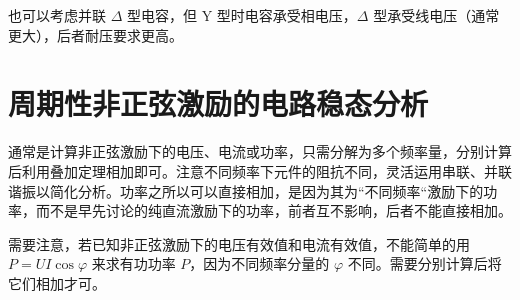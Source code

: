 \documentclass[UTF8]{report}
\theoremstyle{MyLineTheoremStyle} %
\theoremstyle{MyBlockTheoremStyle} %
\theoremstyle{MySubsubsectionStyle} %
\begin{document}
也可以考虑并联 $\Delta$ 型电容，但 Y 型时电容承受相电压，$\Delta$ 型承受线电压（通常更大），后者耐压要求更高。


\section{周期性非正弦激励的电路稳态分析}

通常是计算非正弦激励下的电压、电流或功率，只需分解为多个频率量，分别计算后利用叠加定理相加即可。注意不同频率下元件的阻抗不同，灵活运用串联、并联谐振以简化分析。功率之所以可以直接相加，是因为其为“不同频率“激励下的功率，而不是早先讨论的纯直流激励下的功率，前者互不影响，后者不能直接相加。


需要注意，若已知非正弦激励下的电压有效值和电流有效值，不能简单的用 $P = U I \cos \varphi$ 来求有功功率 $P$，因为不同频率分量的 $\varphi$ 不同。需要分别计算后将它们相加才可。
\end{document}
